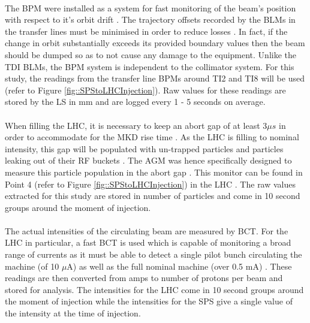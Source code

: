 \paragraph{ }The \ac{BPM} were installed as a system for fast monitoring of the beam's position with respect to it's orbit drift \cite{Schmidt2006}. The trajectory offsets recorded by the \acs{BLM}s in the transfer lines must be minimised in order to reduce losses \cite{Drosdal2011}. In fact, if the change in orbit substantially exceeds its provided boundary values then the beam should be dumped \cite{Schmidt2006} so as to not cause any damage to the equipment. Unlike the \acs{TDI} \acs{BLM}s, the \acs{BPM} system is independent to the collimator system. For this study, the readings from the transfer line \acs{BPM}s around TI2 and TI8 will be used (refer to Figure \ref{fig::SPStoLHCInjection}). Raw values for these readings are stored by the \acs{LS} in \ac{mm} and are logged every 1 - 5 seconds on average.

\paragraph{ }When filling the \acs{LHC}, it is necessary to keep an abort gap of at least 3$\mu s$ in order to accommodate for the \ac{MKD} rise time \cite{Meddahi2010}. As the \ac{LHC} is filling to nominal intensity, this gap will be populated with un-trapped particles and particles leaking out of their \ac{RF} buckets \cite{Meddahi2010}. The \ac{AGM} was hence specifically designed to measure this particle population in the abort gap \cite{Lefevre2010}. This monitor can be found in Point 4 (refer to Figure \ref{fig::SPStoLHCInjection}) in the LHC \cite{Lefevre2010}. The raw values extracted for this study are stored in number of particles and come in 10 second groups around the moment of injection.
 
\paragraph{ }The actual intensities of the circulating beam are measured by \ac{BCT}. For the \acs{LHC} in particular, a fast \acs{BCT} is used which is capable of monitoring a broad range of currents as it must be able to detect a single pilot bunch circulating the machine (of 10 $\mu$A) as well as the full nominal machine (over 0.5 mA) \cite{Jones2007}. These readings are then converted from amps to number of protons per beam and stored for analysis. The intensities for the \acs{LHC} come in 10 second groups around the moment of injection while the intensities for the \acs{SPS} give a single value of the intensity at the time of injection. 

